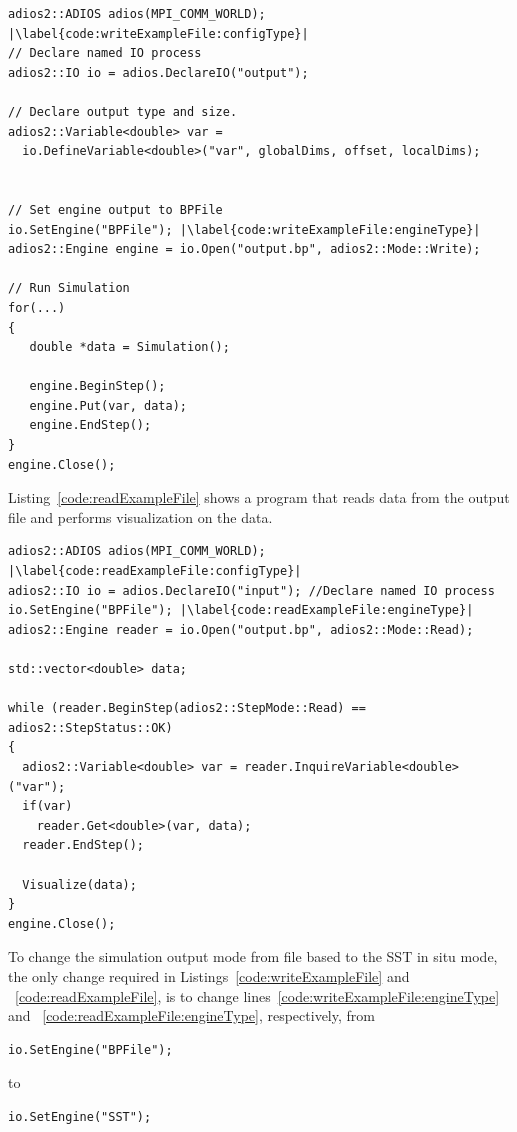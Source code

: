 \begin{minipage}{\linewidth}
\begin{lstlisting}[frame=single,label={cxxAPI},caption={Example of simulation writing outputs to a file.}, label=code:writeExampleFile]
adios2::ADIOS adios(MPI_COMM_WORLD); |\label{code:writeExampleFile:configType}|
// Declare named IO process
adios2::IO io = adios.DeclareIO("output");

// Declare output type and size.
adios2::Variable<double> var = 
  io.DefineVariable<double>("var", globalDims, offset, localDims);
                                

// Set engine output to BPFile
io.SetEngine("BPFile"); |\label{code:writeExampleFile:engineType}|
adios2::Engine engine = io.Open("output.bp", adios2::Mode::Write);

// Run Simulation
for(...)
{
   double *data = Simulation();
   
   engine.BeginStep();
   engine.Put(var, data);
   engine.EndStep();
}
engine.Close();
\end{lstlisting}
\end{minipage}

Listing~\ref{code:readExampleFile} shows a program that reads data from the output file and performs visualization on the data.

\begin{minipage}{\linewidth}
\begin{lstlisting}[frame=single,label={cxxAPI},caption={Example of a visualization  program reading data from a file}, label=code:readExampleFile]
adios2::ADIOS adios(MPI_COMM_WORLD); |\label{code:readExampleFile:configType}|
adios2::IO io = adios.DeclareIO("input"); //Declare named IO process
io.SetEngine("BPFile"); |\label{code:readExampleFile:engineType}|
adios2::Engine reader = io.Open("output.bp", adios2::Mode::Read);

std::vector<double> data;

while (reader.BeginStep(adios2::StepMode::Read) == adios2::StepStatus::OK)
{
  adios2::Variable<double> var = reader.InquireVariable<double>("var");
  if(var)
    reader.Get<double>(var, data);
  reader.EndStep();
  
  Visualize(data);
}
engine.Close();
\end{lstlisting}
\end{minipage}

To change the simulation output mode from file based to the SST in situ mode, the only change required in Listings~\ref{code:writeExampleFile} and ~\ref{code:readExampleFile}, is to change lines~\ref{code:writeExampleFile:engineType} and ~\ref{code:readExampleFile:engineType}, respectively, from
\begin{lstlisting}[numbers=none]
io.SetEngine("BPFile");
\end{lstlisting}
to 
\begin{lstlisting}[numbers=none]
io.SetEngine("SST");
\end{lstlisting}

